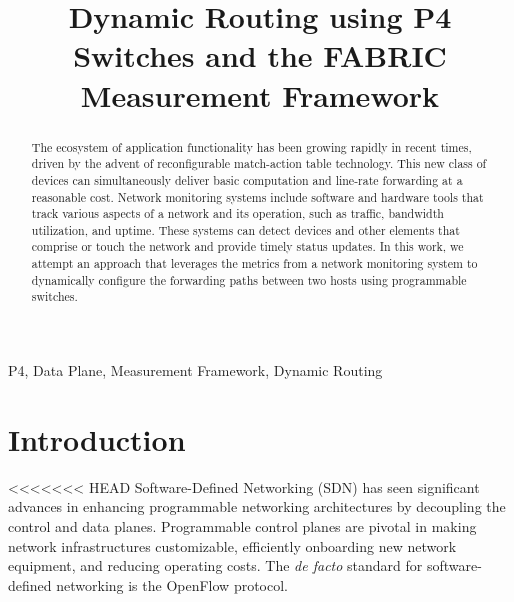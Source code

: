 \documentclass[conference]{IEEEtran}
\begin{document}
	\title{Dynamic Routing using P4 Switches and the FABRIC Measurement Framework\\}

	\author{
	\and
	}
\maketitle

	\begin{abstract}
	The ecosystem of application functionality has been growing rapidly in recent times, driven by the advent of reconfigurable match-action table technology. This new class of devices can simultaneously deliver basic computation and line-rate forwarding at a reasonable cost. Network monitoring systems include software and hardware tools that track various aspects of a network and its operation, such as traffic, bandwidth utilization, and uptime. These systems can detect devices and other elements that comprise or touch the network and provide timely status updates. In this work, we attempt an approach that leverages the metrics from a network monitoring system to dynamically configure the forwarding paths between two hosts using programmable switches.
	\end{abstract}
    \begin{IEEEkeywords} P4, Data Plane, Measurement Framework, Dynamic Routing \end{IEEEkeywords}

    \section{Introduction}
<<<<<<< HEAD
    Software-Defined Networking (SDN) has seen significant advances in enhancing programmable networking architectures by decoupling the control and data planes. Programmable control planes are pivotal in making network infrastructures customizable, efficiently onboarding new network equipment, and reducing operating costs. The \textit{de facto} standard for software-defined networking is the OpenFlow protocol. 
    
\end{document}
